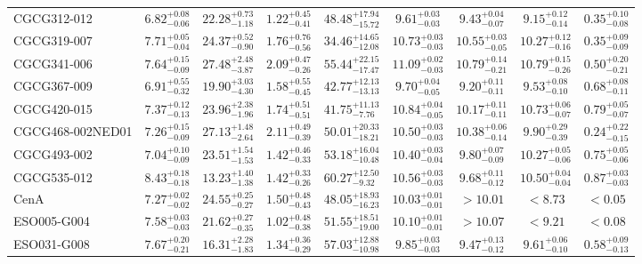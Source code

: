 \documentclass[onecolumn]{mn2e}
\begin{document}
{\begin{center}
\begin{longtable}{lcccccccc}
CGCG312-012 & $6.82_{-0.06}^{+0.08}$ & $22.28_{-1.18}^{+0.73}$ & $1.22_{-0.41}^{+0.45}$ &$48.48_{-15.72}^{+17.94}$ & $9.61_{-0.03}^{+0.03}$ & $9.43_{-0.07}^{+0.04}$ & $9.15_{-0.14}^{+0.12}$ & $0.35_{-0.08}^{+0.10}$ \\
CGCG319-007 & $7.71_{-0.04}^{+0.05}$ & $24.37_{-0.90}^{+0.52}$ & $1.76_{-0.56}^{+0.76}$ &$34.46_{-12.08}^{+14.65}$ & $10.73_{-0.03}^{+0.03}$ & $10.55_{-0.05}^{+0.03}$ & $10.27_{-0.16}^{+0.12}$ & $0.35_{-0.09}^{+0.09}$ \\
CGCG341-006 & $7.64_{-0.09}^{+0.15}$ & $27.48_{-3.87}^{+2.48}$ & $2.09_{-0.26}^{+0.47}$ &$55.44_{-17.47}^{+22.15}$ & $11.09_{-0.03}^{+0.02}$ & $10.79_{-0.21}^{+0.14}$ & $10.79_{-0.26}^{+0.15}$ & $0.50_{-0.21}^{+0.20}$ \\
CGCG367-009 & $6.91_{-0.32}^{+0.55}$ & $19.90_{-4.30}^{+3.03}$ & $1.58_{-0.45}^{+0.55}$ &$42.77_{-13.13}^{+12.13}$ & $9.70_{-0.05}^{+0.04}$ & $9.20_{-0.11}^{+0.11}$ & $9.53_{-0.10}^{+0.08}$ & $0.68_{-0.11}^{+0.08}$ \\
CGCG420-015 & $7.37_{-0.13}^{+0.12}$ & $23.96_{-1.96}^{+2.38}$ & $1.74_{-0.51}^{+0.51}$ &$41.75_{-7.76}^{+11.13}$ & $10.84_{-0.05}^{+0.04}$ & $10.17_{-0.11}^{+0.11}$ & $10.73_{-0.07}^{+0.06}$ & $0.79_{-0.07}^{+0.05}$ \\
CGCG468-002NED01 & $7.26_{-0.09}^{+0.15}$ & $27.13_{-2.64}^{+1.48}$ & $2.11_{-0.39}^{+0.49}$ &$50.01_{-18.21}^{+20.33}$ & $10.50_{-0.03}^{+0.03}$ & $10.38_{-0.14}^{+0.06}$ & $9.90_{-0.39}^{+0.29}$ & $0.24_{-0.15}^{+0.22}$ \\
CGCG493-002 & $7.04_{-0.09}^{+0.10}$ & $23.51_{-1.53}^{+1.54}$ & $1.42_{-0.33}^{+0.46}$ &$53.18_{-10.48}^{+16.04}$ & $10.40_{-0.04}^{+0.03}$ & $9.80_{-0.09}^{+0.07}$ & $10.27_{-0.06}^{+0.05}$ & $0.75_{-0.06}^{+0.05}$ \\
CGCG535-012 & $8.43_{-0.18}^{+0.18}$ & $13.23_{-1.38}^{+1.40}$ & $1.42_{-0.26}^{+0.33}$ &$60.27_{-9.32}^{+12.50}$ & $10.56_{-0.03}^{+0.03}$ & $9.68_{-0.12}^{+0.11}$ & $10.50_{-0.04}^{+0.04}$ & $0.87_{-0.03}^{+0.03}$ \\
CenA & $7.27_{-0.02}^{+0.02}$ & $24.55_{-0.27}^{+0.25}$ & $1.50_{-0.43}^{+0.48}$ &$48.05_{-16.23}^{+18.93}$ & $10.03_{-0.01}^{+0.01}$ & $>10.01$ & $<8.73$ & $<0.05$ \\
ESO005-G004 & $7.58_{-0.03}^{+0.03}$ & $21.62_{-0.35}^{+0.27}$ & $1.02_{-0.38}^{+0.48}$ &$51.55_{-19.00}^{+18.51}$ & $10.10_{-0.01}^{+0.01}$ & $>10.07$ & $<9.21$ & $<0.08$ \\
ESO031-G008 & $7.67_{-0.21}^{+0.20}$ & $16.31_{-1.83}^{+2.28}$ & $1.34_{-0.29}^{+0.36}$ &$57.03_{-10.98}^{+12.88}$ & $9.85_{-0.03}^{+0.03}$ & $9.47_{-0.12}^{+0.13}$ & $9.61_{-0.10}^{+0.06}$ & $0.58_{-0.13}^{+0.09}$ \\

\end{longtable}
\end{center}}
\end{document}

